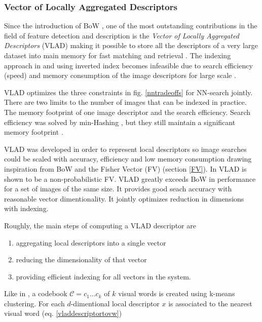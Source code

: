 \documentclass[english,12pt,a4paper,pdftex,elec,utf8]{aaltothesis}
\begin{document}
\subsubsection{Vector of Locally Aggregated Descriptors}
Since the introduction of BoW \cite{Sivic2003}, one of the most outstanding contributions in the field of feature detection and description is the \emph{Vector of Locally Aggregated Descriptors} (VLAD) making it possible to store all the descriptors of a very large dataset into main memory for fast matching and retrieval \cite{Arandjelovic2013}. The indexing approach in \cite{Sivic2003} and \cite{Jegou2008} using inverted index becomes infeasible due to search efficiency (speed) and memory consumption of the image descriptors for large scale \cite{Jegou2010}.

VLAD optimizes the three constraints in fig. \ref{nntradeoffs} for NN-search jointly. There are two limits to the number of images that can be indexed in practice. The memory footprint of one image descriptor and the search efficiency. Search efficiency was solved by min-Hashing \cite{Chum2008}, \cite{Chum2009} but they still maintain a significant memory footprint \cite{Jegou2010}.

VLAD was developed in order to represent local descriptors so image searches could be scaled with accuracy, efficiency and low memory consumption drawing inspiration from BoW and the Fisher Vector (FV) (section \ref{FV}). In \cite{Jegou2012} VLAD is shown to be a non-probabilistic FV. VLAD greatly exceeds BoW in performance for a set of images of the same size. It provides good seach accuracy with reasonable vector dimentionality. It jointly optimizes reduction in dimensions with indexing. \cite{Jegou2010}

Roughly, the main steps of computing a VLAD descriptor are
\begin{enumerate}
\item aggregating local descriptors into a single vector
\item reducing the dimensionality of that vector
\item providing efficient indexing for all vectors in the system.
\end{enumerate}

Like in \cite{Sivic2003}, \cite{Jegou2011} a codebook $\mathcal{C}={c_1 \ldots c_k}$ of $k$ visual words is created using k-means clustering. For each $d$-dimentional local descriptor $x$ is associated to the nearest visual word (eq. \ref{vladdescriptortovw})
\end{document}
